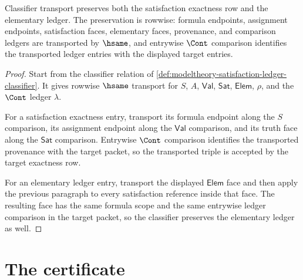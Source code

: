 \begin{theorem}\label{thm:modeltheory-carrier-classifier-stability}
Classifier transport preserves both the satisfaction exactness row and the
elementary ledger. The preservation is rowwise: formula endpoints, assignment
endpoints, satisfaction faces, elementary faces, provenance, and comparison
ledgers are transported by $\hsame$, and entrywise $\Cont$ comparison
identifies the transported ledger entries with the displayed target entries.
\end{theorem}
\begin{proof}
Start from the classifier relation of
\autoref{def:modeltheory-satisfaction-ledger-classifier}. It gives rowwise
$\hsame$ transport for $S$, $A$, $\mathsf{Val}$, $\mathsf{Sat}$,
$\mathsf{Elem}$, $\rho$, and the $\Cont$ ledger $\lambda$.

For a satisfaction exactness entry, transport its formula endpoint along the
$S$ comparison, its assignment endpoint along the $\mathsf{Val}$ comparison,
and its truth face along the $\mathsf{Sat}$ comparison. Entrywise $\Cont$
comparison identifies the transported provenance with the target packet, so
the transported triple is accepted by the target exactness row.

For an elementary ledger entry, transport the displayed $\mathsf{Elem}$ face
and then apply the previous paragraph to every satisfaction reference inside
that face. The resulting face has the same formula scope and the same
entrywise ledger comparison in the target packet, so the classifier preserves
the elementary ledger as well.
\end{proof}

\section{The certificate}
\label{sec:modeltheory-certificate}

